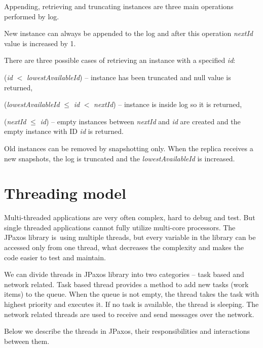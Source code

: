 Appending, retrieving and truncating instances are three main operations per\-for\-med by log.

New instance can always be appended to the log and after this operation \textit{nextId} value is increased by 1.

\noindent There are three possible cases of retrieving an instance with a specified \textit{id}:
\begin{tightList}
  \item[\textbullet] (\textit{id} $<$ \textit{lowestAvailableId}) -- instance has been truncated and null value is returned,
  \item[\textbullet] (\textit{lowestAvailableId} $\leq$ \textit{id} $<$ \textit{nextId}) -- instance is inside log so it is returned,
  \item[\textbullet] (\textit{nextId} $\leq$ \textit{id}) -- empty instances between \textit{nextId} and \textit{id} are created and the empty instance with ID \textit{id} is returned.
\end{tightList}

\noindent Old instances can be removed by snapshotting only. When the replica receives a new snapshots, the log is truncated and the \textit{lowestAvailableId} is increased.

\section{Threading model}
\label{sec:threads}

Multi-threaded applications are very often complex, hard to debug and test. But single threaded applications cannot fully utilize multi-core processors. The JPaxos library is~using multiple threads, but every variable in the library can be accessed only from one thread, what decreases the complexity and makes the code easier to test and maintain.

We can divide threads in JPaxos library into two categories -- task based and
network related.
Task based thread provides a method to add new tasks (work
items) to the queue. When the queue is not empty, the thread takes the task
with highest priority and executes it. If no task is available, the thread is
sleeping. The network related threads are used to receive and send messages
over the network.

Below we describe the threads in JPaxos, their responsibilities and interactions between them. 

